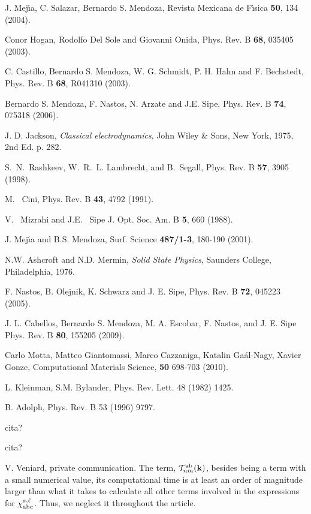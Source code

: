 \documentclass[floatfix,prb,aps,superscriptaddress,11pt,preprint]{revtex4}
\begin{document}
\begin{thebibliography}{99}
J. Mej\'{\i}a, C. Salazar, Bernardo S. Mendoza,
Revista Mexicana de F\'{\i}sica
{\bf 50}, 134 (2004).

Conor Hogan, Rodolfo Del Sole and Giovanni Onida, Phys. Rev. B
{\bf 68}, 035405 (2003).

C. Castillo, Bernardo S. Mendoza, W. G. Schmidt, P. H. Hahn and F. Bechstedt,
Phys. Rev. B 
{\bf 68}, R041310 (2003).

Bernardo S. Mendoza, F. Nastos, N. Arzate and J.E. Sipe,
Phys. Rev. B {\bf 74}, 075318 (2006).

 J. D. Jackson, {\it Classical electrodynamics}, John
Wiley {\&} Sons, New York, 1975, 2nd Ed. p. 282.

 S.~N.~Rashkeev, W.~R.~L. Lambrecht, and B.~Segall,
Phys. Rev. B {\bf 57}, 3905 (1998).

 M.~ Cini, Phys. Rev. B {\bf 43}, 4792 (1991).

V.~ Mizrahi and J.E.~ Sipe
J. Opt. Soc. Am. B {\bf 5}, 660 (1988).

J. Mej\'{\i}a and B.S. Mendoza, Surf. Science {\bf 487/1-3},
180-190 (2001).

N.W. Ashcroft and N.D. Mermin, 
{\it Solid State Physics},
Saunders College, Philadelphia, 1976.

F. Nastos, B. Olejnik, K. Schwarz and J. E. Sipe, Phys. Rev. B {\bf 72}, 045223 (2005).

J. L. Cabellos, Bernardo S. Mendoza, M. A. Escobar, F. Nastos, and J. E. Sipe
 Phys. Rev. B {\bf 80}, 155205 (2009).

Carlo Motta, Matteo Giantomassi, Marco Cazzaniga, Katalin Gaál-Nagy,
Xavier Gonze,
Computational Materials Science, {\bf 50} 698-703 (2010). 

L. Kleinman, S.M. Bylander, Phys. Rev. Lett. 48 (1982) 1425.

B. Adolph, Phys. Rev. B 53 (1996) 9797.

cita?

cita?

 V. Veniard, private communication. 
The term, ${\cal T}^{\mathrm{a}\mathrm{b}}_{nm}(\mathbf{k})$, besides being a
  term with a small numerical value, its computational 
time is 
at least an
  order of magnitude larger than what it takes to calculate all other
  terms involved in the expressions for
  $\chi^{s,\ell}_{\mathrm{a}\mathrm{b}\mathrm{c}}$. Thus, we neglect it throughout the article.

\end{thebibliography}
\end{document}
